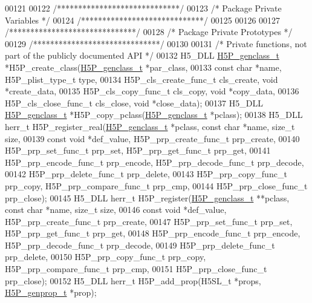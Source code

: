 \begin{DoxyCode}
00121 
00122 \textcolor{comment}{/*****************************/}
00123 \textcolor{comment}{/* Package Private Variables */}
00124 \textcolor{comment}{/*****************************/}
00125 
00126 
00127 \textcolor{comment}{/******************************/}
00128 \textcolor{comment}{/* Package Private Prototypes */}
00129 \textcolor{comment}{/******************************/}
00130 
00131 \textcolor{comment}{/* Private functions, not part of the publicly documented API */}
00132 H5\_DLL \hyperlink{struct_h5_p__genclass__t}{H5P\_genclass\_t} *H5P\_create\_class(\hyperlink{struct_h5_p__genclass__t}{H5P\_genclass\_t} *par\_class,
00133     \textcolor{keyword}{const} \textcolor{keywordtype}{char} *name, H5P\_plist\_type\_t type,
00134     H5P\_cls\_create\_func\_t cls\_create, \textcolor{keywordtype}{void} *create\_data,
00135     H5P\_cls\_copy\_func\_t cls\_copy, \textcolor{keywordtype}{void} *copy\_data,
00136     H5P\_cls\_close\_func\_t cls\_close, \textcolor{keywordtype}{void} *close\_data);
00137 H5\_DLL \hyperlink{struct_h5_p__genclass__t}{H5P\_genclass\_t} *H5P\_copy\_pclass(\hyperlink{struct_h5_p__genclass__t}{H5P\_genclass\_t} *pclass);
00138 H5\_DLL herr\_t H5P\_register\_real(\hyperlink{struct_h5_p__genclass__t}{H5P\_genclass\_t} *pclass, \textcolor{keyword}{const} \textcolor{keywordtype}{char} *name, \textcolor{keywordtype}{size\_t} size,
00139     \textcolor{keyword}{const} \textcolor{keywordtype}{void} *def\_value, H5P\_prp\_create\_func\_t prp\_create,
00140     H5P\_prp\_set\_func\_t prp\_set, H5P\_prp\_get\_func\_t prp\_get,
00141     H5P\_prp\_encode\_func\_t prp\_encode, H5P\_prp\_decode\_func\_t prp\_decode,
00142     H5P\_prp\_delete\_func\_t prp\_delete,
00143     H5P\_prp\_copy\_func\_t prp\_copy, H5P\_prp\_compare\_func\_t prp\_cmp,
00144     H5P\_prp\_close\_func\_t prp\_close);
00145 H5\_DLL herr\_t H5P\_register(\hyperlink{struct_h5_p__genclass__t}{H5P\_genclass\_t} **pclass, \textcolor{keyword}{const} \textcolor{keywordtype}{char} *name, \textcolor{keywordtype}{size\_t} size,
00146     \textcolor{keyword}{const} \textcolor{keywordtype}{void} *def\_value, H5P\_prp\_create\_func\_t prp\_create,
00147     H5P\_prp\_set\_func\_t prp\_set, H5P\_prp\_get\_func\_t prp\_get,
00148     H5P\_prp\_encode\_func\_t prp\_encode, H5P\_prp\_decode\_func\_t prp\_decode,
00149     H5P\_prp\_delete\_func\_t prp\_delete,
00150     H5P\_prp\_copy\_func\_t prp\_copy, H5P\_prp\_compare\_func\_t prp\_cmp,
00151     H5P\_prp\_close\_func\_t prp\_close);
00152 H5\_DLL herr\_t H5P\_add\_prop(H5SL\_t *props, \hyperlink{struct_h5_p__genprop__t}{H5P\_genprop\_t} *prop);

\end{DoxyCode}
